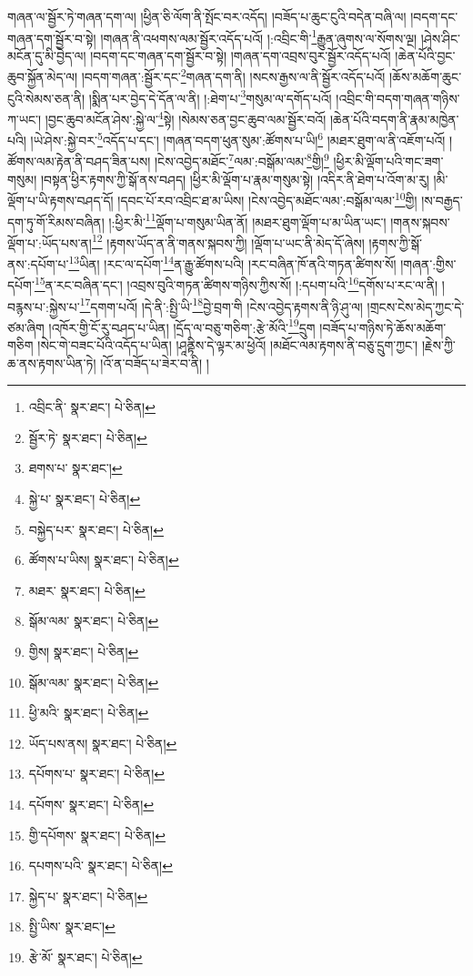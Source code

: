 གཞན་ལ་སྦྱོར་ཏེ་གཞན་དག་ལ། །ཕྱིན་ཅི་ལོག་ནི་སྤོང་བར་འདོད། །བཟོད་པ་ཆུང་ངུའི་བདེན་བཞི་ལ། །བདག་དང་གཞན་དག་སྦྱོར་བ་སྟེ། །གཞན་ནི་འཕགས་ལམ་སྦྱོར་འདོད་པའོ། །:འབྲིང་གི་\footnote{འབྲིང་ནི་  སྣར་ཐང་།  པེ་ཅིན། }རྒྱུན་ཞུགས་ལ་སོགས་ལྔ། །ཤེས་ཤིང་མངོན་དུ་མི་བྱེད་ལ། །བདག་དང་གཞན་དག་སྦྱོར་བ་སྟེ། །གཞན་དག་འབྲས་བུར་སྦྱོར་འདོད་པའོ། །ཆེན་པོའི་བྱང་ཆུབ་སྐྱོན་མེད་ལ། །བདག་གཞན་:སྦྱོར་དང་\footnote{སྦྱོར་ཏེ་  སྣར་ཐང་།  པེ་ཅིན། }གཞན་དག་ནི། །སངས་རྒྱས་ལ་ནི་སྦྱོར་འདོད་པའོ། །ཆོས་མཆོག་ཆུང་ངུའི་སེམས་ཅན་ནི། །སྨིན་པར་བྱེད་དེ་དོན་ལ་ནི། །:ཐེག་པ་\footnote{ཐགས་པ་  སྣར་ཐང་། }གསུམ་ལ་དགོད་པའོ། །འབྲིང་གི་བདག་གཞན་གཉིས་ཀ་ཡང་། །བྱང་ཆུབ་མངོན་ཤེས་:སྐྱེ་ལ་\footnote{སྐྱེ་པ་  སྣར་ཐང་།  པེ་ཅིན། }སྟེ། །སེམས་ཅན་བྱང་ཆུབ་ལམ་སྦྱོར་བའོ། །ཆེན་པོའི་བདག་ནི་རྣམ་མཁྱེན་པའི། །ཡེ་ཤེས་:སྐྱེ་བར་\footnote{བསྐྱེད་པར་  སྣར་ཐང་།  པེ་ཅིན། }འདོད་པ་དང་། །གཞན་བདག་ཕུན་སུམ་:ཚོགས་པ་ཡི།\footnote{ཚོགས་པ་ཡིས།  སྣར་ཐང་།  པེ་ཅིན། } །མཐར་ཐུག་ལ་ནི་འཇོག་པའོ། །ཚོགས་ལམ་རྟེན་ནི་བཤད་ཟིན་པས། །ངེས་འབྱེད་མཐོང་\footnote{མཐར་  སྣར་ཐང་།  པེ་ཅིན། }ལམ་:བསྒོམ་ལམ་\footnote{སྒོམ་ལམ་  སྣར་ཐང་།  པེ་ཅིན། }གྱི།\footnote{གྱིས།  སྣར་ཐང་།  པེ་ཅིན། } །ཕྱིར་མི་ལྡོག་པའི་གང་ཟག་གསུམ། །བསྟན་ཕྱིར་རྟགས་ཀྱི་སྒོ་ནས་བཤད། །ཕྱིར་མི་ལྡོག་པ་རྣམ་གསུམ་སྟེ། །འདིར་ནི་ཐེག་པ་འོག་མ་རུ། །མི་ལྡོག་པ་ཡི་རྟགས་བཤད་དོ། །དབང་པོ་རབ་འབྲིང་ཐ་མ་ཡིས། །ངེས་འབྱེད་མཐོང་ལམ་:བསྒོམ་ལམ་\footnote{སྒོམ་ལམ་  སྣར་ཐང་།  པེ་ཅིན། }གྱི། །ས་བརྒྱད་དག་ཏུ་གོ་རིམས་བཞིན། །:ཕྱིར་མི་\footnote{ཕྱི་མའི་  སྣར་ཐང་།  པེ་ཅིན། }ལྡོག་པ་གསུམ་ཡིན་ནོ། །མཐར་ཐུག་ལྡོག་པ་མ་ཡིན་ཡང་། །གནས་སྐབས་ལྡོག་པ་:ཡོད་པས་ན།\footnote{ཡོད་པས་ནས།  སྣར་ཐང་།  པེ་ཅིན། } །རྟགས་ཡོད་ན་ནི་གནས་སྐབས་ཀྱི། །ལྡོག་པ་ཡང་ནི་མེད་དོ་ཞེས། །རྟགས་ཀྱི་སྒོ་ནས་:དཔོག་པ་\footnote{དཔོགས་པ་  སྣར་ཐང་།  པེ་ཅིན། }ཡིན། །རང་ལ་དཔོག་\footnote{དཔོགས་  སྣར་ཐང་།  པེ་ཅིན། }ན་རྒྱུ་ཚོགས་པའི། །རང་བཞིན་ཁོ་ནའི་གཏན་ཚིགས་སོ། །གཞན་:གྱིས་དཔོག་\footnote{གྱི་དཔོགས་  སྣར་ཐང་།  པེ་ཅིན། }ན་རང་བཞིན་དང་། །འབྲས་བུའི་གཏན་ཚིགས་གཉིས་ཀྱིས་སོ། །:དཔག་པའི་\footnote{དཔགས་པའི་  སྣར་ཐང་།  པེ་ཅིན། }དགོས་པ་རང་ལ་ནི། །བརྙས་པ་:སྐྱེས་པ་\footnote{སྐྱེད་པ་  སྣར་ཐང་།  པེ་ཅིན། }དགག་པའོ། །དེ་ནི་:སྤྱི་ཡི་\footnote{སྤྱི་ཡིས་  སྣར་ཐང་། }བྱེ་བྲག་གི །ངེས་འབྱེད་རྟགས་ནི་ཉི་ཤུ་ལ། །གྲངས་ངེས་མེད་ཀྱང་དེ་ཙམ་ཞིག །འཁོར་གྱི་ངོ་རུ་བཤད་པ་ཡིན། །དྲོད་ལ་བཅུ་གཅིག་:རྩེ་མོའི་\footnote{རྩེ་མོ་  སྣར་ཐང་།  པེ་ཅིན། }དྲུག །བཟོད་པ་གཉིས་ཏེ་ཆོས་མཆོག་གཅིག །སེང་གེ་བཟང་པོའི་འདོད་པ་ཡིན། །ཤཱནྟིས་དེ་ལྟར་མ་ཕྱེའོ། །མཐོང་ལམ་རྟགས་ནི་བཅུ་དྲུག་ཀྱང་། །རྗེས་ཀྱི་ཆ་ནས་རྟགས་ཡིན་ཏེ། །འོ་ན་བཟོད་པ་ཟེར་བ་ནི། །
